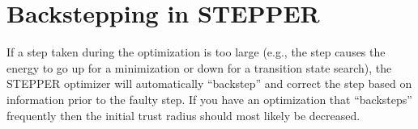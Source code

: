 %
%
%
%
%


\section{Backstepping in STEPPER}
\label{sec:stepper:backstep}
If a step taken during the optimization is too large (e.g., the step
causes the energy to go up for a minimization or down for a transition
state search), the STEPPER optimizer will automatically ``backstep''
and correct the step based on information prior to the faulty step.
If you have an optimization that ``backsteps'' frequently then the
initial trust radius should most likely be decreased.



